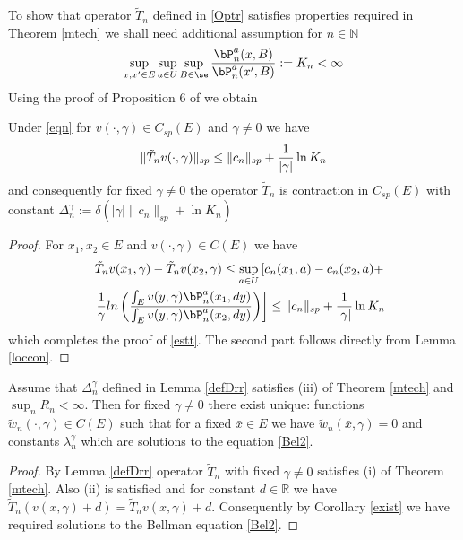 \documentclass[10pt,english]{extarticle}
\begin{document}
To show that operator $\tilde{T}_n$ defined in \eqref{Optr} satisfies properties required in Theorem \ref{mtech} we shall need additional assumption for $n\in \mathbb{N}$
\begin{equation}\label{eqn}
\sup_{x,x'\in E} \sup_{a\in U} \sup_{B\in \se} {\bP_n^a(x,B) \over \bP_n^a(x',B)}:=K_n<\infty
\end{equation}
Using the proof of Proposition 6 of \cite{Ste2023} we obtain
\begin{lemma}\label{defDrr}
Under \eqref{eqn} for $v(\cdot,\gamma)\in C_{sp}(E)$ and $\gamma\neq 0$  we have
\begin{equation}\label{estt}
\|\tilde{T}_nv(\cdot,\gamma)\|_{sp}\leq \|c_n\|_{sp} + {1\over |\gamma|} \ln K_n
\end{equation}
and consequently for fixed $\gamma\neq 0$ the operator $\tilde{T}_n$ is contraction in $C_{sp}(E)$ with constant
$\Delta_n^\gamma:=\delta(|\gamma|\|c_n\|_{sp} + \ln K_n)$
\end{lemma}
\begin{proof}
For $x_1,x_2\in E$ and $v(\cdot,\gamma)\in C(E)$ we have
\begin{eqnarray}
&&\tilde{T}_nv(x_1,\gamma)-\tilde{T}_nv(x_2,\gamma)\leq \sup_{a\in U}\left[ c_n(x_1,a)-c_n(x_2,a)+ \right. \nonumber \\
&&\left. {1\over \gamma} ln\left({\int_E v(y,\gamma) \bP_n^a(x_1,dy)\over \int_E v(y,\gamma) \bP_n^a(x_2,dy)}\right)\right]\leq  \|c_n\|_{sp} + {1\over |\gamma|} \ln K_n
\end{eqnarray}
which completes the proof of \eqref{estt}. The second part follows directly from Lemma \ref{loccon}.  
\end{proof}

\begin{theorem}\label{averpr}
Assume that $\Delta_n^\gamma$ defined in Lemma \ref{defDrr} satisfies (iii) of Theorem \ref{mtech} and $\sup_n R_n<\infty$. Then for fixed $\gamma\neq 0$  there exist unique: functions  $\tilde{w}_n(\cdot,\gamma)\in C(E)$ such that for a fixed $\bar{x}\in E$ we have  $\tilde{w}_n(\bar{x},\gamma)=0$ and constants $\lambda_n^\gamma$ which are solutions to the equation \eqref{Bel2}.
\end{theorem}

\begin{proof} By Lemma \ref{defDrr} operator $\tilde{T}_n$ with fixed $\gamma\neq 0$ satisfies (i) of Theorem 
\ref{mtech}. Also (ii) is satisfied and for constant $d\in \mathbb{R}$ we have  $\tilde{T}_n (v(x,\gamma)+d)=
\tilde{T}_n v(x,\gamma)+d$. Consequently by Corollary \ref{exist} we have required solutions to the Bellman equation \eqref{Bel2}.
\end{proof}
 
\end{document}
